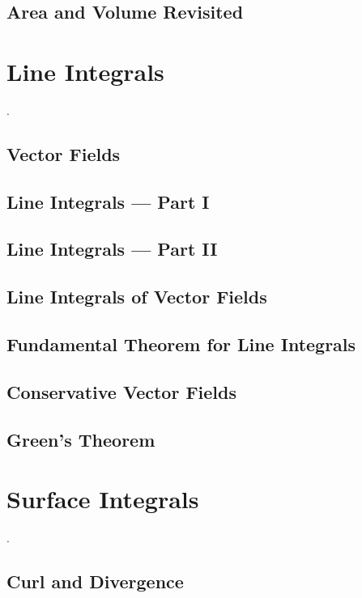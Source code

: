\documentclass[12pt]{article}
\theoremstyle{definition}
\begin{document}
\subsection{Area and Volume Revisited}

\section{Line Integrals}
.

\subsection{Vector Fields}

\subsection{Line Integrals --- Part I}

\subsection{Line Integrals --- Part II}

\subsection{Line Integrals of Vector Fields}

\subsection{Fundamental Theorem for Line Integrals}

\subsection{Conservative Vector Fields}

\subsection{Green's Theorem}

\section{Surface Integrals}
.

\subsection{Curl and Divergence}
\end{document}
